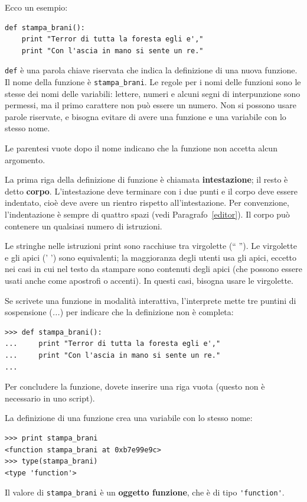 \documentclass[10pt]{book}
\begin{document}
Ecco un esempio:

\begin{verbatim}
def stampa_brani():
    print "Terror di tutta la foresta egli e',"
    print "Con l'ascia in mano si sente un re."
\end{verbatim}
%
{\tt def} è una parola chiave riservata che indica la definizione di una nuova funzione. Il nome della funzione è \verb"stampa_brani".  Le regole per i nomi delle funzioni sono le stesse dei nomi delle variabili: lettere, numeri e alcuni segni di interpunzione sono permessi, ma il primo carattere non può essere un numero. Non si possono usare parole riservate, e bisogna evitare di avere una funzione e una variabile con lo stesso nome.

Le parentesi vuote dopo il nome indicano che la funzione non accetta alcun argomento.

La prima riga della definizione di funzione è chiamata {\bf intestazione};
il resto è detto {\bf corpo}. L'intestazione deve terminare con i due punti e il corpo deve essere indentato, cioè deve avere un rientro rispetto all'intestazione. Per convenzione, l'indentazione è sempre di quattro spazi (vedi Paragrafo~\ref{editor}). Il corpo può contenere un qualsiasi numero di istruzioni.

Le stringhe nelle istruzioni print sono racchiuse tra virgolette (`` ''). Le virgolette e gli apici (' ') sono equivalenti; la maggioranza degli utenti usa gli apici, eccetto nei casi in cui nel testo da stampare sono contenuti degli apici (che possono essere usati anche come apostrofi o accenti). In questi casi, bisogna usare le virgolette.

Se scrivete una funzione in modalità interattiva, l'interprete mette tre puntini di sospensione ({\em ...}) per indicare che la definizione non è completa:

\begin{verbatim}
>>> def stampa_brani():
...     print "Terror di tutta la foresta egli e',"
...     print "Con l'ascia in mano si sente un re."
...
\end{verbatim}
%
Per concludere la funzione, dovete inserire una riga vuota (questo non è necessario in uno script).

La definizione di una funzione crea una variabile con lo stesso nome:

\begin{verbatim}
>>> print stampa_brani
<function stampa_brani at 0xb7e99e9c>
>>> type(stampa_brani)
<type 'function'>
\end{verbatim}
%
Il valore di \verb"stampa_brani" è un {\bf oggetto funzione}, che è di tipo \verb"'function'".
\end{document}
